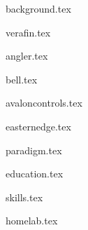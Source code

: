 \documentclass[11pt]{article}
\begin{document}
{background.tex}


{verafin.tex}

{angler.tex}

{bell.tex}

{avaloncontrols.tex}

{easternedge.tex}

{paradigm.tex}


{education.tex}


{skills.tex}


{homelab.tex}


\end{document}
